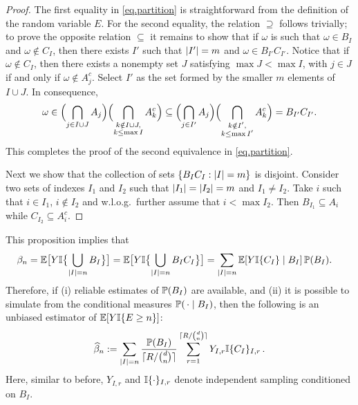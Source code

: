 \begin{proof}

 The first equality in \eqref{eq.partition} is straightforward from the definition of
 the random variable $E$. For the second equality, the relation $\boldsymbol{\supseteq}$ follows trivially;
 to prove the opposite relation $\boldsymbol{\subseteq}$ it remains to show that
 if  $\omega$ is such that $\omega\in B_I$ and $\omega\notin C_I$,
 then there exists $I'$ such that $\lvert I'\rvert=m$ and $\omega\in B_{I'}C_{I'}$.  Notice that
 if $\omega\notin C_I$, then there exists a nonempty set $J$ satisfying
 $\max J<\max I$, with $j\in J$ if and only if $\omega\notin A_j^c$.
 Select $I'$ as the set formed
 by the smaller $m$ elements of $I\cup J$.  In consequence,
 \begin{equation*}
  \omega\in
  \Bigl(\bigcap_{j\in I\cup J}A_j\Bigr) \Bigl(\bigcap_{\substack{k\notin I\cup J,\\k\le\max I}} A_k^c\Bigr)
  \subseteq
  \Bigl(\bigcap_{j\in I'}A_j\Bigr) \Bigl(\bigcap_{\substack{k\notin I',\\k\le\max I'}} A_k^c\Bigr)
  =B_{I'}C_{I'}.
 \end{equation*}
 This completes the proof of the second equivalence in \eqref{eq.partition}.

 Next we show that the collection of sets $\{B_IC_I:\lvert I\rvert=m\}$ is disjoint.  Consider two sets of indexes
 $I_1$ and $I_2$ such that
 $\lvert I_1\rvert=\lvert I_2\rvert=m$ and $I_1\neq I_2$. Take $i$ such that
 $i\in I_1$, $i\notin I_2$ and w.l.o.g.\ further assume that $i<\max I_2$.
 Then $B_{I_1}\subseteq A_i$ while $C_{I_2}\subseteq A_i^c$.
\end{proof}
This proposition implies that
 \begin{align*}
  \beta_n&=\operatorname{{\mathbb E}}\bigl[Y\mathbb{I}\bigl\{ \bigcup_{\lvert I\rvert=n} B_I \bigr\}\bigr]
    =\operatorname{{\mathbb E}}\bigl[Y\mathbb{I}\bigl\{ \bigcup_{\lvert I\rvert=n} B_IC_I \bigr\}\bigr]
  =\sum_{\lvert I\rvert=n}\operatorname{{\mathbb E}}[Y \mathbb{I}\{ C_I \} \mid B_I ] \operatorname{{\mathbb P}}(B_I).
 \end{align*}
  Therefore, if (i)
 reliable estimates of  $\operatorname{{\mathbb P}}(B_I)$ are available, and
 (ii) it is possible to simulate from the conditional measures
 $\operatorname{{\mathbb P}}(\, \cdot \mid B_I)$,
then the following is an unbiased estimator of $\operatorname{{\mathbb E}}[Y\mathbb{I}\{ E\ge n \}]$:
 \begin{equation}\label{beta_hat}
 \widehat{\beta}_n
   :=\sum_{\lvert I\rvert=n} \frac{ \operatorname{{\mathbb P}}(B_I) }{\lceil R/\binom{d}{n} \rceil}
   \sum_{r=1}^{\lceil R/\binom{d}{n} \rceil}
   Y_{I,r} \mathbb{I}\{  C_I  \}_{I,r} \,.
 \end{equation}
 Here, similar to before, $Y_{I,r}$ and $\mathbb{I}\{  \cdot  \}_{I,r}$ denote independent sampling conditioned on $B_I$.

